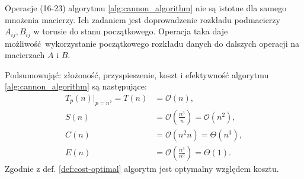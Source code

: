 Operacje (16-23) algorytmu \ref{alg:cannon_algorithm} nie są istotne dla samego mnożenia macierzy. Ich zadaniem jest doprowadzenie rozkładu podmacierzy \(A_{ij}, B_{ij}\) w torusie do stanu początkowego. Operacja taka daje możliwość wykorzystanie początkowego rozkładu danych do dalszych operacji na macierzach \(A\) i \(B\).


Podsumowująć: złożoność, przyspieszenie, koszt i efektywność algorytmu \ref{alg:cannon_algorithm} są następujące\cite{Czech}:
\begin{align*}
T_p(n)|_{p=n^2} = T(n) &= \mathcal{O}(n), \\
S(n) &= \mathcal{O}(\frac{n^3}{n}) = \mathcal{O}(n^2), \\
C(n) &= \mathcal{O}(n^2n)=\Theta(n^3), \\
E(n) &= \mathcal{O}(\frac{n^3}{n^3})=\Theta(1).
\end{align*}
Zgodnie z def. \ref{def:cost-optimal} algorytm jest optymalny względem kosztu.


